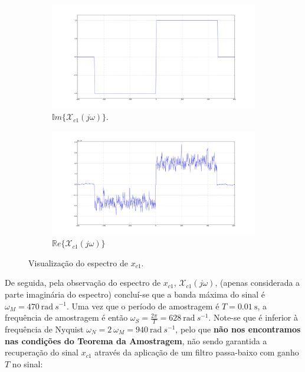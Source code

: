 \begin{figure}[H] 
    \begin{subfigure}[b]{0.5\linewidth}
        \centering
        \includegraphics[width=1\linewidth]{prints/imag_XC1.png}
        \caption{\(\mathbb{I}m\{\mathcal{X}_{c1}(j\omega)\}\).} 
        \label{fig:imag_XC1} 
    \end{subfigure}%
    \begin{subfigure}[b]{0.5\linewidth}
        \centering
        \includegraphics[width=1\linewidth]{prints/real_XC1.png} 
        \caption{\(\mathbb{R}e\{\mathcal{X}_{c1}(j\omega)\}\)} 
        \label{fig:real_XC1} 
    \end{subfigure} 
    \caption{Visualização do espectro de \(x_{c1}\).}
    \label{fig:multiplas_8}
\end{figure}

De seguida, pela observação do espectro de \(x_{c1}\), \(\mathcal{X}_{c1}(j\omega)\), (apenas considerada a parte imaginária do espectro) concluí-se que a banda máxima do sinal é \(\omega_M = 470\ \text{rad}\ s^{-1}\). 
Uma vez que o período de amostragem é \(T = 0.01\ \text{s}\), a frequência de amostragem é então \(\omega_S = \frac{2\pi}{T} = 628\ \text{rad}\ s^{-1}\). Note-se que é inferior à frequência de Nyquist \(\omega_N = 2\ \omega_M = 940\ \text{rad}\ s^{-1}\), pelo que \textbf{não nos encontramos nas condições do Teorema da Amostragem}, não sendo garantida a recuperação do sinal \(x_{c1}\) através da aplicação de um filtro passa-baixo com ganho \(T\) no sinal:

